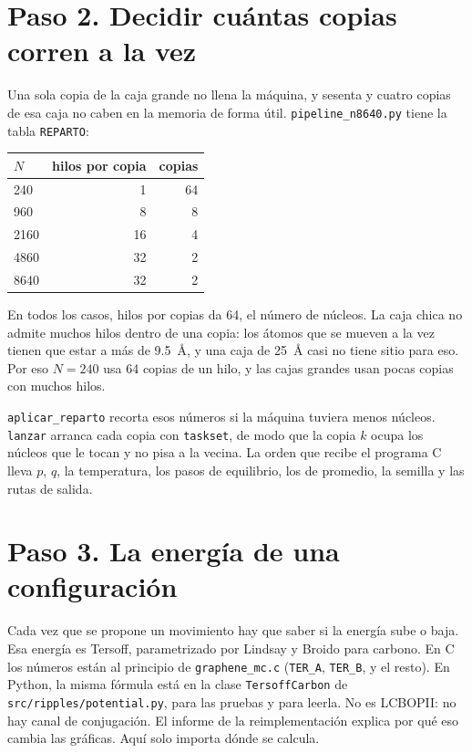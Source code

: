 \documentclass[11pt,a4paper]{article}
\newcommand{\fn}[1]{\texttt{#1}}
\begin{document}
\section{Paso 2. Decidir cuántas copias corren a la vez}

Una sola copia de la caja grande no llena la máquina, y sesenta y cuatro copias de esa caja no caben en la memoria de forma útil. \fn{pipeline\_n8640.py} tiene la tabla \fn{REPARTO}:

\begin{center}
\begin{tabular}{lrr}
\toprule
$N$ & hilos por copia & copias \\
\midrule
240 & 1 & 64 \\
960 & 8 & 8 \\
2160 & 16 & 4 \\
4860 & 32 & 2 \\
8640 & 32 & 2 \\
\bottomrule
\end{tabular}
\end{center}

En todos los casos, hilos por copias da 64, el número de núcleos. La caja chica no admite muchos hilos dentro de una copia: los átomos que se mueven a la vez tienen que estar a más de 9.5~Å, y una caja de 25~Å casi no tiene sitio para eso. Por eso $N=240$ usa 64 copias de un hilo, y las cajas grandes usan pocas copias con muchos hilos.

\fn{aplicar\_reparto} recorta esos números si la máquina tuviera menos núcleos. \fn{lanzar} arranca cada copia con \fn{taskset}, de modo que la copia $k$ ocupa los núcleos que le tocan y no pisa a la vecina. La orden que recibe el programa C lleva $p$, $q$, la temperatura, los pasos de equilibrio, los de promedio, la semilla y las rutas de salida.

\section{Paso 3. La energía de una configuración}

Cada vez que se propone un movimiento hay que saber si la energía sube o baja. Esa energía es Tersoff, parametrizado por Lindsay y Broido para carbono. En C los números están al principio de \fn{graphene\_mc.c} (\fn{TER\_A}, \fn{TER\_B}, y el resto). En Python, la misma fórmula está en la clase \fn{TersoffCarbon} de \fn{src/ripples/potential.py}, para las pruebas y para leerla. No es LCBOPII: no hay canal de conjugación. El informe de la reimplementación explica por qué eso cambia las gráficas. Aquí solo importa dónde se calcula.
\end{document}
